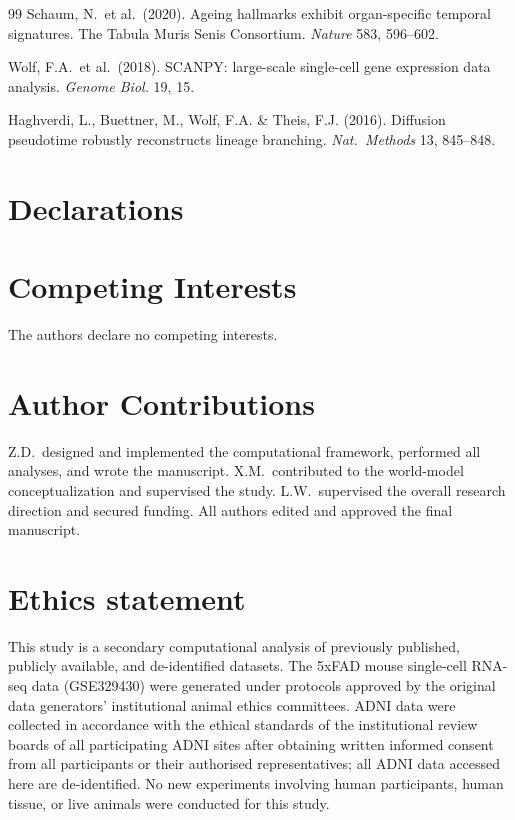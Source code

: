 \documentclass[12pt,a4paper]{article}
\begin{document}
\begin{thebibliography}{99}
 Schaum, N.\ et al.\ (2020). Ageing hallmarks exhibit organ-specific temporal signatures. The Tabula Muris Senis Consortium. \textit{Nature} 583, 596--602.

 Wolf, F.A.\ et al.\ (2018). SCANPY: large-scale single-cell gene expression data analysis. \textit{Genome Biol.} 19, 15.

 Haghverdi, L., Buettner, M., Wolf, F.A. \& Theis, F.J. (2016). Diffusion pseudotime robustly reconstructs lineage branching. \textit{Nat.\ Methods} 13, 845--848.

\end{thebibliography}

\section*{Declarations}

\section*{Competing Interests}
The authors declare no competing interests.

\section*{Author Contributions}
Z.D.\ designed and implemented the computational framework, performed all analyses, and wrote the manuscript. X.M.\ contributed to the world-model conceptualization and supervised the study. L.W.\ supervised the overall research direction and secured funding. All authors edited and approved the final manuscript.

\section*{Ethics statement}
This study is a secondary computational analysis of previously published, publicly available, and de-identified datasets. The 5xFAD mouse single-cell RNA-seq data (GSE329430) were generated under protocols approved by the original data generators' institutional animal ethics committees. ADNI data were collected in accordance with the ethical standards of the institutional review boards of all participating ADNI sites after obtaining written informed consent from all participants or their authorised representatives; all ADNI data accessed here are de-identified. No new experiments involving human participants, human tissue, or live animals were conducted for this study.
\end{document}
